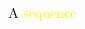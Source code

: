 \documentclass[preview]{standalone}
\begin{document}
\begin{align*}
\text{A } \textcolor{yellow}{\text{sequence}}
\end{align*}
\end{document}
